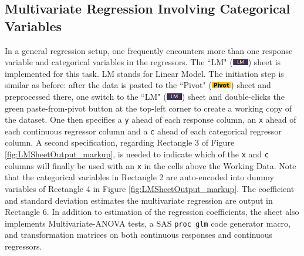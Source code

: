 \documentclass[article]{jss}
\newcommand{\shtPivot}{``Pivot" (\includegraphics[height=8pt, keepaspectratio=true]{PivotSheetTab_png}) }
\newcommand{\shtLM}{``LM" (\includegraphics[height=8pt, keepaspectratio=true]{LMSheetTab_png}) }
\begin{document}
        \subsection[egLM]{Multivariate Regression Involving Categorical Variables}
        In a general regression setup, one frequently encounters more than one response variable and categorical variables in the regressors. The \shtLM sheet is implemented for this task. LM stands for Linear Model. The initiation step is similar as before: after the data is pasted to the \shtPivot sheet and preprocessed there, one switch to the \shtLM sheet and double-clicks the green paste-from-pivot button at the top-left corner to create a working copy of the dataset. One then specifies a \texttt{y} ahead of each response column, an \texttt{x} ahead of each continuous regressor column and a \texttt{c} ahead of each categorical regressor column. A second specification, regarding Rectangle 3 of Figure \ref{fig:LMSheetOutput_markup}, is needed to indicate which of the \texttt{x} and \texttt{c} columns will finally be used with an \texttt{x} in the cells above the Working Data. Note that the categorical variables in Rectangle 2 are auto-encoded into dummy variables of Rectangle 4 in Figure \ref{fig:LMSheetOutput_markup}. The coefficient and standard deviation estimates the multivariate regression are output in Rectangle 6.
        In addition to estimation of the regression coefficients, the sheet also implements Multivariate-ANOVA tests, a SAS \texttt{proc glm} code generator macro, and transformation matrices on both continuous responses and continuous regressors.
\end{document}
